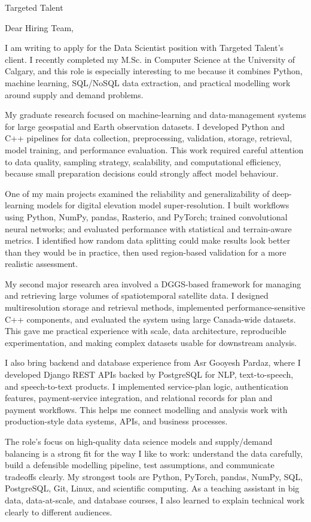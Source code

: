 \documentclass[10pt]{letter}
\begin{document}
\begin{letter}{Targeted Talent}

\opening{Dear Hiring Team,}

I am writing to apply for the Data Scientist position with Targeted Talent's client. I recently completed my M.Sc. in Computer Science at the University of Calgary, and this role is especially interesting to me because it combines Python, machine learning, SQL/NoSQL data extraction, and practical modelling work around supply and demand problems.

My graduate research focused on machine-learning and data-management systems for large geospatial and Earth observation datasets. I developed Python and C++ pipelines for data collection, preprocessing, validation, storage, retrieval, model training, and performance evaluation. This work required careful attention to data quality, sampling strategy, scalability, and computational efficiency, because small preparation decisions could strongly affect model behaviour.

One of my main projects examined the reliability and generalizability of deep-learning models for digital elevation model super-resolution. I built workflows using Python, NumPy, pandas, Rasterio, and PyTorch; trained convolutional neural networks; and evaluated performance with statistical and terrain-aware metrics. I identified how random data splitting could make results look better than they would be in practice, then used region-based validation for a more realistic assessment.

My second major research area involved a DGGS-based framework for managing and retrieving large volumes of spatiotemporal satellite data. I designed multiresolution storage and retrieval methods, implemented performance-sensitive C++ components, and evaluated the system using large Canada-wide datasets. This gave me practical experience with scale, data architecture, reproducible experimentation, and making complex datasets usable for downstream analysis.

I also bring backend and database experience from Asr Gooyesh Pardaz, where I developed Django REST APIs backed by PostgreSQL for NLP, text-to-speech, and speech-to-text products. I implemented service-plan logic, authentication features, payment-service integration, and relational records for plan and payment workflows. This helps me connect modelling and analysis work with production-style data systems, APIs, and business processes.

The role's focus on high-quality data science models and supply/demand balancing is a strong fit for the way I like to work: understand the data carefully, build a defensible modelling pipeline, test assumptions, and communicate tradeoffs clearly. My strongest tools are Python, PyTorch, pandas, NumPy, SQL, PostgreSQL, Git, Linux, and scientific computing. As a teaching assistant in big data, data-at-scale, and database courses, I also learned to explain technical work clearly to different audiences.


\end{letter}
\end{document}
